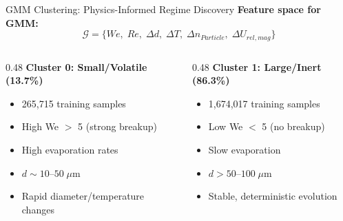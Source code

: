 \documentclass[aspectratio=169]{beamer}
\begin{document}
\begin{frame}{GMM Clustering: Physics-Informed Regime Discovery}
\textbf{Feature space for GMM:}
\begin{equation*}
\mathcal{G} = \{We,\; Re,\; \Delta d,\; \Delta T,\; \Delta n_{Particle},\; \Delta U_{rel,mag}\}
\end{equation*}

\pause
\vspace{0.1cm}
\begin{columns}[T]
\begin{column}{0.48\textwidth}
\textbf{\color{cluster0}Cluster 0: Small/Volatile (13.7\%)}
\begin{itemize}[<+->]
    \item 265,715 training samples
    \item High We $>$ 5 (strong breakup)
    \item High evaporation rates
    \item $d \sim 10$--$50\;\mu$m
    \item Rapid diameter/temperature changes
\end{itemize}
\end{column}
\begin{column}{0.48\textwidth}
\pause
\textbf{\color{cluster1}Cluster 1: Large/Inert (86.3\%)}
\begin{itemize}[<+->]
    \item 1,674,017 training samples
    \item Low We $<$ 5 (no breakup)
    \item Slow evaporation
    \item $d > 50$--$100\;\mu$m
    \item Stable, deterministic evolution
\end{itemize}
\end{column}
\end{columns}


\end{frame}
\end{document}

